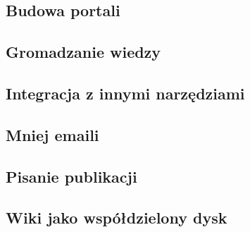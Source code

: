 \documentclass{article}
\begin{document}
	\subsection{Budowa portali}  
	\subsection{Gromadzanie wiedzy}

	\subsection{Integracja z innymi narzędziami}
	\subsection{Mniej emaili}



	\subsection{Pisanie publikacji}

	\subsection{Wiki jako współdzielony dysk}
\end{document}
